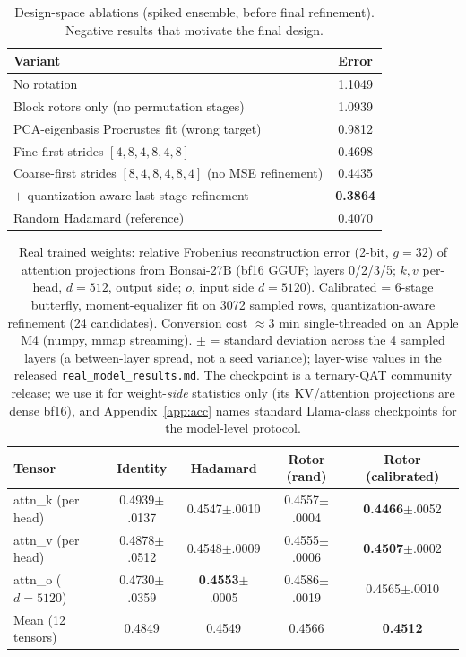 \documentclass{article}
\begin{document}
\begin{table}[t]
\centering\small
\caption{Design-space ablations (spiked ensemble, before final refinement).
Negative results that motivate the final design.}
\label{tab:ablation}
\begin{tabular}{lc}
\toprule
Variant & Error \\
\midrule
No rotation & 1.1049 \\
Block rotors only (no permutation stages) & 1.0939 \\
PCA-eigenbasis Procrustes fit (wrong target) & 0.9812 \\
Fine-first strides $[4,8,4,8,4,8]$ & 0.4698 \\
Coarse-first strides $[8,4,8,4,8,4]$ (no MSE refinement) & 0.4435 \\
$+$ quantization-aware last-stage refinement & \textbf{0.3864} \\
Random Hadamard (reference) & 0.4070 \\
\bottomrule
\end{tabular}
\end{table}

\begin{table}[t]
\centering\small
\caption{Real trained weights: relative Frobenius reconstruction error
(2-bit, $g=32$) of attention projections from Bonsai-27B (bf16 GGUF; layers
0/2/3/5; $k,v$ per-head, $d{=}512$, output side; $o$, input side $d{=}5120$).
Calibrated = 6-stage butterfly, moment-equalizer fit on 3072 sampled rows,
quantization-aware refinement (24 candidates). Conversion cost $\approx$3 min
single-threaded on an Apple M4 (numpy, mmap streaming). $\pm$ = standard
deviation across the 4 sampled layers (a between-layer spread, not a seed
variance); layer-wise values in the released \texttt{real\_model\_results.md}.
The checkpoint is a ternary-QAT community release; we use it for weight-\emph{side}
statistics only (its KV/attention projections are dense bf16), and Appendix~\ref{app:acc}
names standard Llama-class checkpoints for the model-level protocol.}
\label{tab:real}
\begin{tabular}{lcccc}
\toprule
Tensor & Identity & Hadamard & Rotor (rand) & Rotor (calibrated) \\
\midrule
attn\_k (per head) & 0.4939{\scriptsize$\pm$.0137} & 0.4547{\scriptsize$\pm$.0010} & 0.4557{\scriptsize$\pm$.0004} & \textbf{0.4466}{\scriptsize$\pm$.0052} \\
attn\_v (per head) & 0.4878{\scriptsize$\pm$.0512} & 0.4548{\scriptsize$\pm$.0009} & 0.4555{\scriptsize$\pm$.0006} & \textbf{0.4507}{\scriptsize$\pm$.0002} \\
attn\_o ($d{=}5120$) & 0.4730{\scriptsize$\pm$.0359} & \textbf{0.4553}{\scriptsize$\pm$.0005} & 0.4586{\scriptsize$\pm$.0019} & 0.4565{\scriptsize$\pm$.0010} \\
\midrule
Mean (12 tensors) & 0.4849 & 0.4549 & 0.4566 & \textbf{0.4512} \\
\bottomrule
\end{tabular}
\end{table}
\end{document}
